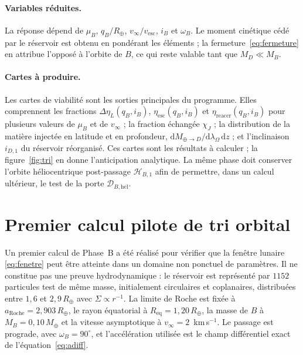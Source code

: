 \documentclass[11pt,a4paper,openany]{report}
\newcommand{\Mt}{M_{\oplus}}
\newcommand{\Rt}{R_{\oplus}}
\newcommand{\Req}{R_{\mathrm{eq}}}
\newcommand{\dd}{\mathrm{d}}
\begin{document}
\paragraph{Variables réduites.}
La réponse dépend de $\mu_B$, $q_B/\Rt$, $v_\infty/v_{\mathrm{esc}}$, $i_B$ et $\omega_B$. Le moment
cinétique cédé par le réservoir est obtenu en pondérant les éléments ; la
fermeture~\eqref{eq:fermeture} en attribue l'opposé à l'orbite de $B$, ce qui reste valable tant que
$M_D\ll M_B$.

\paragraph{Cartes à produire.}
Les cartes de viabilité sont les sorties principales du programme. Elles comprennent les
fractions $\Delta\eta_L(q_B,i_B)$, $\eta_{\mathrm{esc}}(q_B,i_B)$ et $\eta_{\mathrm{reaccr}}(q_B,i_B)$ pour
plusieurs valeurs de $\mu_B$ et de $v_\infty$ ; la fraction échangée $\chi_J$ ; la distribution
de la matière injectée en latitude et en profondeur, $\dd M_{\oplus\to D}/\dd\lambda_\Omega\,\dd z$ ; et l'inclinaison $i_{D,1}$ du
réservoir réorganisé. Ces cartes sont les résultats à calculer ; la figure~\ref{fig:tri} en donne
l'anticipation analytique.
La même phase doit conserver l'orbite héliocentrique post-passage $\mathcal{H}_{B,1}$ afin de
permettre, dans un calcul ultérieur, le test de la porte $\mathcal{D}_{B,\mathrm{hel}}$.

\section{Premier calcul pilote de tri orbital}
\label{sec:pilote-etaL}

Un premier calcul de Phase~B a été réalisé pour vérifier que la fenêtre lunaire
\eqref{eq:fenetre} peut être atteinte dans un domaine non ponctuel de paramètres. Il ne constitue
pas une preuve hydrodynamique : le réservoir est représenté par $1152$ particules test de même
masse, initialement circulaires et coplanaires, distribuées entre $1{,}6$ et $2{,}9\,\Rt$ avec
$\Sigma\propto r^{-1}$. La limite de Roche est fixée à $a_{\mathrm{Roche}}=2{,}903\,\Rt$, le rayon
équatorial à $\Req=1{,}20\,\Rt$, la masse de $B$ à $M_B=0{,}10\,\Mt$ et la vitesse asymptotique à
$v_\infty=2$~km\,s$^{-1}$. Le passage est prograde, avec $\omega_B=90^\circ$, et l'accélération
utilisée est le champ différentiel exact de l'équation~\eqref{eq:adiff}.
\end{document}
